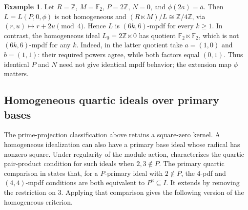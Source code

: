 \documentclass[11pt,a4paper]{amsart}
\theoremstyle{definition}
\newtheorem{example}[theorem]{Example}
\theoremstyle{remark}
\numberwithin{equation}{section}
\begin{document}
\begin{example}\label{ex:nonsplit-characteristic-four}
Let $R=\mathbb Z$, $M=\mathbb F_2$, $P=2\mathbb Z$, $N=0$, and
$\phi(2a)=\overline a$. Then $L=L(P,0,\phi)$ is not homogeneous and
$(R\ltimes M)/L\cong\mathbb Z/4\mathbb Z$, via
$(r,u)\mapsto r+2u\pmod4$. Hence $L$ is $(6k,6)$-mpdf for every $k\geq1$.
In contrast, the homogeneous ideal $L_0=2\mathbb Z\ltimes0$ has quotient
$\mathbb F_2\ltimes\mathbb F_2$, which is not $(6k,6)$-mpdf for any $k$.
Indeed, in the latter quotient take $a=(1,0)$ and $b=(1,1)$: their
required powers agree, while both factors equal $(0,1)$.
Thus identical $P$ and $N$ need not give identical mpdf behavior; the
extension map $\phi$ matters.
\end{example}

\subsection{Homogeneous quartic ideals over primary bases}
\label{quartic:primary-idealization-section}

The prime-projection classification above retains a square-zero
kernel. A homogeneous idealization can also have a primary base
ideal whose radical has nonzero square. Under regularity of the
module action, \cite[Theorem~5.5]{TAHA} characterizes the quartic
pair-product condition for such ideals when $2,3\notin P$.
The primary quartic comparison in \cite[Theorem~3.17]{TS} states that, for a
$P$-primary ideal with $2\notin P$, the 4-pdf and $(4,4)$-mpdf
conditions are both equivalent to $P^3\subseteq I$.
It extends \cite[Theorem~4.6]{TAHA} by removing the restriction on
$3$. Applying that comparison gives the following version of the
homogeneous criterion.
\end{document}
